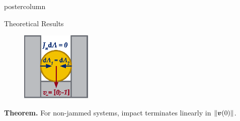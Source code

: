 \documentclass[final,hyperref={pdfpagelabels=false},5pt]{beamer}
\begin{document}
\begin{frame}
\begin{columns}
\begin{column}{.49\textwidth}
\begin{beamercolorbox}[center,wd=\textwidth]{postercolumn}
\begin{minipage}[T]{.95\textwidth}
{\begin{block}{Theoretical Results}
\begin{figure}
              	\hspace{0.125\textwidth}
              	\includegraphics[width=0.3\textwidth]{Bucket}
              \end{figure}
              \begin{tcolorbox}[colback=pennyw,
colframe=penndyw,boxrule=5pt,coltext=pennbl,outer arc=5pt,arc=0pt]
              \textbf{Theorem.} For non-jammed systems, impact terminates linearly in $\left\lVert\bm{v}(0)\right\rVert$.	
              \end{tcolorbox}     
            \end{block}
            
}
\end{minipage}
\end{beamercolorbox}
\end{column}
\end{columns}
\end{frame}
\end{document}
